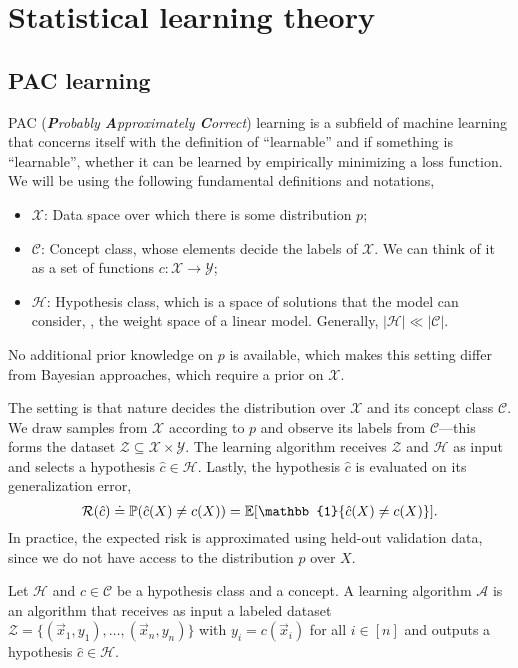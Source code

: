 \section{Statistical learning theory}

\subsection{PAC learning}

PAC (\textit{\textbf{P}robably \textbf{A}pproximately \textbf{C}orrect}) learning is a subfield of
machine learning that concerns itself with the definition of ``learnable'' and if something is
``learnable'', whether it can be learned by empirically minimizing a loss function. We will be
using the following fundamental definitions and notations,
\begin{itemize}
    \item $\mathcal{X}$: Data space over which there is some distribution $p$;
    \item $\mathcal{C}$: Concept class, whose elements decide the labels of $\mathcal{X}$. We can
          think of it as a set of functions $c: \mathcal{X} \to \mathcal{Y}$;
    \item $\mathcal{H}$: Hypothesis class, which is a space of solutions that the model can consider,
          \eg, the weight space of a linear model. Generally, $|\mathcal{H}| \ll |\mathcal{C}|$.
\end{itemize}
No additional prior knowledge on $p$ is available, which makes this setting differ from Bayesian
approaches, which require a prior on $\mathcal{X}$.

The setting is that nature decides the distribution over $\mathcal{X}$ and its concept class
$\mathcal{C}$. We draw samples from $\mathcal{X}$ according to $p$ and observe its labels from
$\mathcal{C}$---this forms the dataset $\mathcal{Z} \subseteq \mathcal{X} \times \mathcal{Y}$. The
learning algorithm receives $\mathcal{Z}$ and $\mathcal{H}$ as input and selects a hypothesis
$\hat{c} \in \mathcal{H}$. Lastly, the hypothesis $\hat{c}$ is evaluated on its generalization
error, \[
    \mathcal{R}(\hat{c}) \doteq \mathbb{P}(\hat{c}(X) \neq c(X)) = \E[\mathbb{1}\{ \hat{c}(X)\neq c(X) \}].
\]
In practice, the expected risk is approximated using held-out validation data, since we do not have
access to the distribution $p$ over $X$.

\begin{definition}
    Let $\mathcal{H}$ and $c \in \mathcal{C}$ be a hypothesis class and a concept. A learning algorithm $\mathcal{A}$
    is an algorithm that receives as input a labeled dataset $\mathcal{Z} = \{ (\vec{x}_1, y_1),
        \ldots, (\vec{x}_n,y_n) \}$ with $y_i = c(\vec{x}_i)$ for all $i \in [n]$ and outputs a
    hypothesis $\hat{c} \in \mathcal{H}$.
\end{definition}

